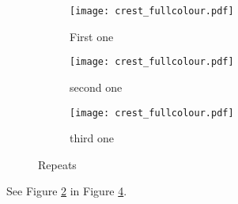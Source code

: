 \lipsum[1]
\begin{figure}[h]
	\centering
	\begin{subfigure}[b]{0.3\textwidth}
		\centering
		\texttt{[image: crest\_fullcolour.pdf]}
		\caption{First one}
		\label{plot_example_graph_first}	
	\end{subfigure}
	\hfill
	\begin{subfigure}[b]{0.3\textwidth}
		\centering
		\texttt{[image: crest\_fullcolour.pdf]}
		\caption{second one}
		\label{plot_example_graph_second}	
	\end{subfigure}
	\hfill
	\begin{subfigure}[b]{0.3\textwidth}
		\centering
		\texttt{[image: crest\_fullcolour.pdf]}
		\caption{third one}
		\label{plot_example_graph_third}	
	\end{subfigure}
	\caption{Repeats}
	\label{plot_subfigures}
\end{figure}
	See Figure \ref{plot_example_graph_second} in Figure \ref{plot_subfigures}.
